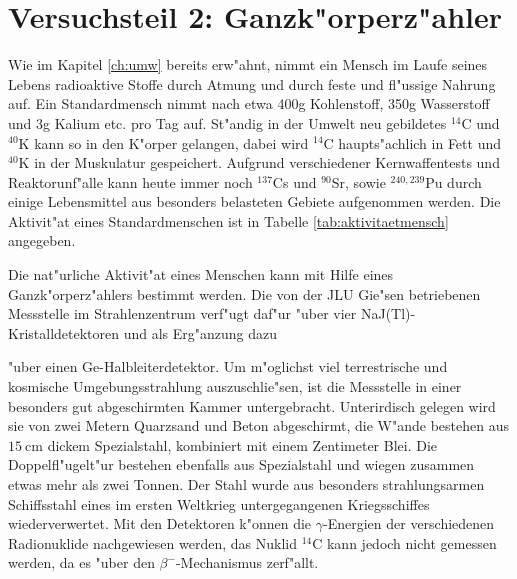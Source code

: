 \documentclass[12pt]{article}
\begin{document}
\section{Versuchsteil 2: Ganzk"orperz"ahler}

Wie im Kapitel \ref{ch:umw} bereits erw"ahnt, nimmt ein Mensch im Laufe seines Lebens radioaktive Stoffe durch Atmung und durch feste und fl"ussige Nahrung auf. Ein Standardmensch nimmt nach \cite{cite4} etwa 400g Kohlenstoff, 350g Wasserstoff und 3g Kalium etc. pro Tag auf. St"andig in der Umwelt neu gebildetes $^{14}$C und $^{40}$K kann so in den K"orper gelangen, dabei wird $^{14}$C haupts"achlich in Fett und $^{40}$K in der Muskulatur gespeichert. Aufgrund verschiedener Kernwaffentests und Reaktorunf"alle kann heute immer noch $^{137}$Cs und $^{90}$Sr, sowie $^{240,239}$Pu durch einige Lebensmittel aus besonders belasteten Gebiete aufgenommen werden. Die Aktivit"at eines Standardmenschen ist in Tabelle \ref{tab:aktivitaetmensch} angegeben.\par 
Die nat"urliche Aktivit"at eines Menschen kann mit Hilfe eines Ganzk"orperz"ahlers bestimmt werden. Die von der JLU Gie"sen betriebenen Messstelle im Strahlenzentrum verf"ugt daf"ur "uber vier NaJ(Tl)-Kristalldetektoren und als Erg"anzung dazu 
\begin{table}[b]
	\centering
	\caption{Auflistung der wichtigsten nat"urlichen Radionuklide im K"orper eines Standardmenschen (Auswahl) \cite{cite4}.}
	\label{tab:aktivitaetmensch}%
\end{table}%
"uber einen Ge-Halbleiterdetektor. Um m"oglichst viel terrestrische und kosmische Umgebungsstrahlung auszuschlie"sen, ist die Messstelle in einer besonders gut abgeschirmten Kammer untergebracht. Unterirdisch gelegen wird sie von zwei Metern Quarzsand und Beton abgeschirmt, die W"ande bestehen aus $\SI{15}{\centi\meter}$ dickem Spezialstahl, kombiniert mit einem Zentimeter Blei. Die Doppelfl"ugelt"ur bestehen ebenfalls aus Spezialstahl und wiegen zusammen etwas mehr als zwei Tonnen. Der Stahl wurde aus besonders strahlungsarmen Schiffsstahl eines im ersten Weltkrieg untergegangenen Kriegsschiffes wiederverwertet. Mit den Detektoren k"onnen die $\gamma$-Energien der verschiedenen Radionuklide nachgewiesen werden, das Nuklid $^{14}$C kann jedoch nicht gemessen werden, da es "uber den $\beta^{-}$-Mechanismus zerf"allt.\par 
\end{document}
